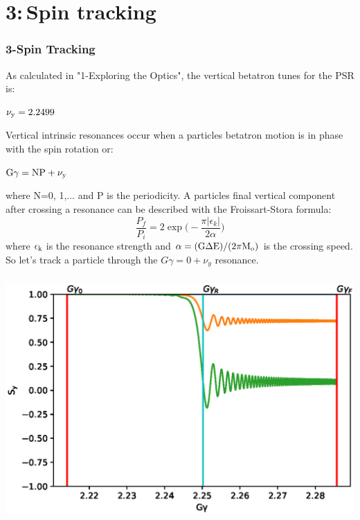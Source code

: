 \documentclass{beamer}
\begin{document}
\section{3:\,Spin tracking}
\begin{frame}
\frametitle{3-Spin Tracking}
\begin{minipage}{1.0\textwidth}
\small
As calculated in "1-Exploring the Optics", the vertical betatron tunes  for the PSR is:
\vspace{-0.2em}
\begin{center}
$\rm\nu_y=2.2499$
\end{center}
\vspace{-0.2em}
Vertical intrinsic resonances occur when a particles betatron motion is in phase with the spin rotation or:
\vspace{-0.2em}
\begin{center}
$\rm G\gamma=NP+\nu_y$
\end{center}
\vspace{-0.2em}
where N=0, 1,... and P is the periodicity. A particles final vertical component after crossing a resonance can be described with the Froissart-Stora formula:
\begin{equation}
\frac{P_f}{P_i}=2\exp\bigg(-\frac{\pi|\epsilon_k|}{2\alpha}\bigg)
\end{equation}
where $\rm\epsilon_k$ is the resonance strength and $\rm \alpha=(G\Delta E)/(2\pi M_o)$ is the crossing speed.\\
So let's track a particle through the $G\gamma=0+\nu_y$ resonance.
\end{minipage}
\end{frame}
\begin{frame}
\frametitle{}
\includegraphics[width=1.0\linewidth]{PSR_FStora.eps}
\end{frame}
\end{document}
